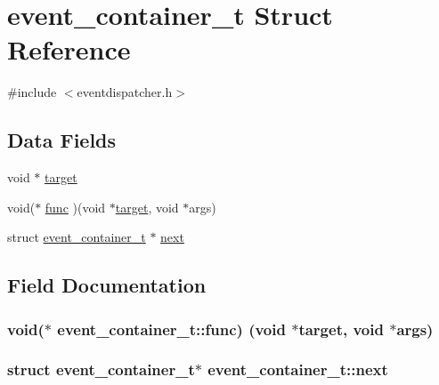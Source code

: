 \hypertarget{structevent__container__t}{}\section{event\+\_\+container\+\_\+t Struct Reference}
\label{structevent__container__t}


{\ttfamily \#include $<$eventdispatcher.\+h$>$}

\subsection*{Data Fields}
\begin{DoxyCompactItemize}
\item 
void $\ast$ \hyperlink{structevent__container__t_a30d9aecb000fe0e8b061b970ad1def64}{target}
\item 
void($\ast$ \hyperlink{structevent__container__t_aaacd0a374bd54844543a994136fdbe9f}{func} )(void $\ast$\hyperlink{structevent__container__t_a30d9aecb000fe0e8b061b970ad1def64}{target}, void $\ast$args)
\item 
struct \hyperlink{structevent__container__t}{event\+\_\+container\+\_\+t} $\ast$ \hyperlink{structevent__container__t_aa376d3f2363bf71a71c7b740cbc26dcd}{next}
\end{DoxyCompactItemize}


\subsection{Field Documentation}
\subsubsection[{\texorpdfstring{func}{func}}]{\setlength{\rightskip}{0pt plus 5cm}void($\ast$ event\+\_\+container\+\_\+t\+::func) (void $\ast${\bf target}, void $\ast$args)}\hypertarget{structevent__container__t_aaacd0a374bd54844543a994136fdbe9f}{}\label{structevent__container__t_aaacd0a374bd54844543a994136fdbe9f}
\subsubsection[{\texorpdfstring{next}{next}}]{\setlength{\rightskip}{0pt plus 5cm}struct {\bf event\+\_\+container\+\_\+t}$\ast$ event\+\_\+container\+\_\+t\+::next}\hypertarget{structevent__container__t_aa376d3f2363bf71a71c7b740cbc26dcd}{}\label{structevent__container__t_aa376d3f2363bf71a71c7b740cbc26dcd}
